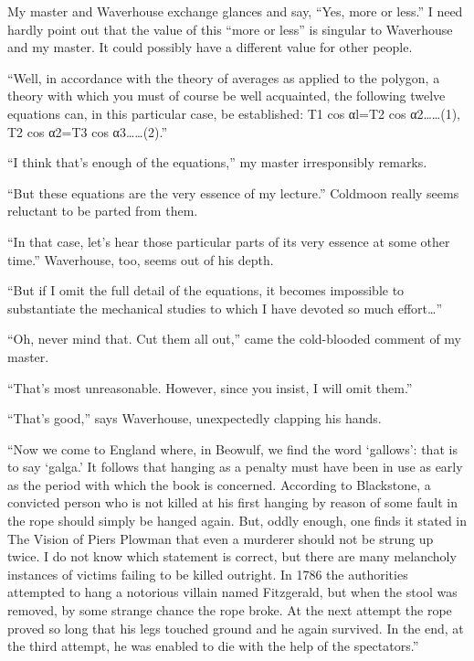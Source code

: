 \documentclass{book}
\begin{document}
My master and Waverhouse exchange glances and say, ``Yes, more or
less.'' I need hardly point out that the value of this ``more or less''
is singular to Waverhouse and my master. It could possibly have a
different value for other people.

``Well, in accordance with the theory of averages as applied to the
polygon, a theory with which you must of course be well acquainted, the
following twelve equations can, in this particular case, be established:
T1 cos αl=T2 cos α2\ldots{}\ldots{}(1), T2 cos α2=T3 cos
α3\ldots{}\ldots{}(2).''

``I think that's enough of the equations,'' my master irresponsibly
remarks.

``But these equations are the very essence of my lecture.'' Coldmoon
really seems reluctant to be parted from them.

``In that case, let's hear those particular parts of its very essence at
some other time.'' Waverhouse, too, seems out of his depth.

``But if I omit the full detail of the equations, it becomes impossible
to substantiate the mechanical studies to which I have devoted so much
effort\ldots{}''

``Oh, never mind that. Cut them all out,'' came the cold-blooded comment
of my master.

``That's most unreasonable. However, since you insist, I will omit
them.''

``That's good,'' says Waverhouse, unexpectedly clapping his hands.

``Now we come to England where, in Beowulf, we find the word `gallows':
that is to say `galga.' It follows that hanging as a penalty must have
been in use as early as the period with which the book is concerned.
According to Blackstone, a convicted person who is not killed at his
first hanging by reason of some fault in the rope should simply be
hanged again. But, oddly enough, one finds it stated in The Vision of
Piers Plowman that even a murderer should not be strung up twice. I do
not know which statement is correct, but there are many melancholy
instances of victims failing to be killed outright. In 1786 the
authorities attempted to hang a notorious villain named Fitzgerald, but
when the stool was removed, by some strange chance the rope broke. At
the next attempt the rope proved so long that his legs touched ground
and he again survived. In the end, at the third attempt, he was enabled
to die with the help of the spectators.''
\end{document}
